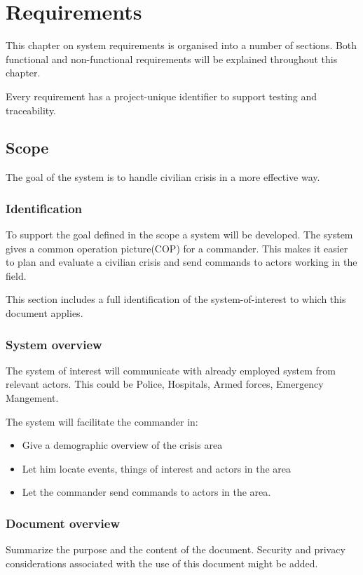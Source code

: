 \label{chp_requirements}
\chapter{Requirements}
This chapter on system requirements is organised into a number of sections. Both functional and non-functional requirements will be explained throughout this chapter.

Every requirement has a project-unique identifier to support testing and traceability.

\section{Scope}
The goal of the system is to handle civilian crisis in a more effective way. 

\subsection{Identification}
To support the goal defined in the scope a system will be developed. The system gives a common operation picture(COP) for a commander. This makes it easier to plan and evaluate a civilian crisis and send commands to actors working in the field.

This section includes a full identification of the system-of-interest to which this document applies.

\subsection{System overview}
The system of interest will communicate with already employed system from relevant actors. This could be Police, Hospitals, Armed forces, Emergency Mangement.

The system will facilitate the commander in:
\begin{itemize}
	\item Give a demographic overview of the crisis area
	\item Let him locate events, things of interest and actors in the area
	\item Let the commander send commands to actors in the area.
\end{itemize}

\subsection{Document overview}
Summarize the purpose and the content of the document. Security and privacy considerations associated with the use of this document might be added.

